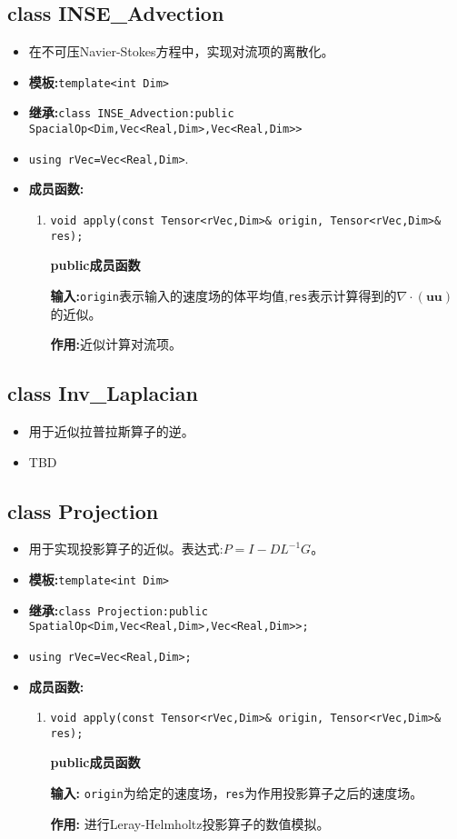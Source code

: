 \documentclass[UTF8]{ctexart}
\theoremstyle{plain}
\theoremstyle{definition}
\theoremstyle{remark}
\begin{document}
\subsection{class INSE\_Advection}
\begin{itemize}
    \item 在不可压Navier-Stokes方程中，实现对流项的离散化。
    \item \textbf{模板:}\texttt{template<int Dim>}
    \item \textbf{继承:}\texttt{class INSE\_Advection:public SpacialOp<Dim,Vec<Real,Dim>,Vec<Real,Dim>>}
    \item \texttt{using rVec=Vec<Real,Dim>}.
    \item \textbf{成员函数:}
    
    \begin{enumerate}
        \item \texttt{void apply(const Tensor<rVec,Dim>\& origin, Tensor<rVec,Dim>\& res);}
        
        \textbf{public成员函数}

        \textbf{输入:}\texttt{origin}表示输入的速度场的体平均值,\texttt{res}表示计算得到的$\nabla\cdot(\mathbf{u}\mathbf{u})$的近似。

        \textbf{作用:}近似计算对流项。
    \end{enumerate}
\end{itemize}
\subsection{class Inv\_Laplacian}
\begin{itemize}
    \item 用于近似拉普拉斯算子的逆。
    \item TBD
\end{itemize}
\subsection{class Projection}
\begin{itemize}
    \item 用于实现投影算子的近似。表达式:$P=I-DL^{-1}G$。
    \item \textbf{模板:}\texttt{template<int Dim>}
    \item \textbf{继承:}\texttt{class Projection:public SpatialOp<Dim,Vec<Real,Dim>,Vec<Real,Dim>>;}
    \item \texttt{using rVec=Vec<Real,Dim>;}
    \item \textbf{成员函数:}
    \begin{enumerate}
        \item \texttt{void apply(const Tensor<rVec,Dim>\& origin, Tensor<rVec,Dim>\& res);}
        
        \textbf{public成员函数}

        \textbf{输入:} \texttt{origin}为给定的速度场，\texttt{res}为作用投影算子之后的速度场。

        \textbf{作用:} 进行Leray-Helmholtz投影算子的数值模拟。
    \end{enumerate}
\end{itemize}
\end{document}
